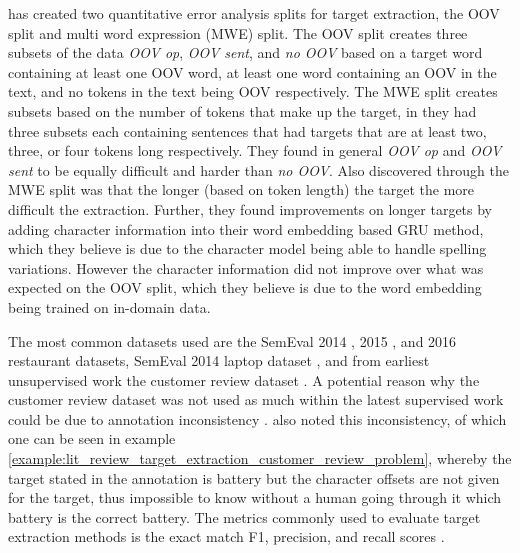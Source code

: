 \citet{jebbara-cimiano-2017-improving} has created two quantitative error analysis splits for target extraction, the OOV split and multi word expression (MWE) split. The OOV split creates three subsets of the data \textit{OOV op}, \textit{OOV sent}, and \textit{no OOV} based on a target word containing at least one OOV word, at least one word containing an OOV in the text, and no tokens in the text being OOV respectively. The MWE split creates subsets based on the number of tokens that make up the target, in \citet{jebbara-cimiano-2017-improving} they had three subsets each containing sentences that had targets that are at least two, three, or four tokens long respectively. They found in general \textit{OOV op} and \textit{OOV sent} to be equally difficult and harder than \textit{no OOV}. Also discovered through the MWE split was that the longer (based on token length) the target the more difficult the extraction. Further, they found improvements on longer targets by adding character information into their word embedding based GRU method, which they believe is due to the character model being able to handle spelling variations. However the character information did not improve over what was expected on the OOV split, which they believe is due to the word embedding being trained on in-domain data.

The most common datasets used are the SemEval 2014 \citep{pontiki-etal-2014-semeval}, 2015 \citep{pontiki-etal-2015-semeval}, and 2016 \citep{pontiki-etal-2016-semeval} restaurant datasets, SemEval 2014 laptop dataset \citep{pontiki-etal-2014-semeval}, and from earliest unsupervised work the customer review dataset \citep{hu2004mining_target_terms}. A potential reason why the customer review dataset was not used as much within the latest supervised work could be due to annotation inconsistency \citep{marrese-taylor-matsuo-2017-replication}. \citet{toprak-etal-2010-sentence} also noted this inconsistency, of which one can be seen in example \ref{example:lit_review_target_extraction_customer_review_problem}, whereby the target stated in the annotation is battery but the character offsets are not given for the target, thus impossible to know without a human going through it which battery is the correct battery. The metrics commonly used to evaluate target extraction methods is the exact match F1, precision, and recall scores \citep{liu-etal-2015-fine}.

